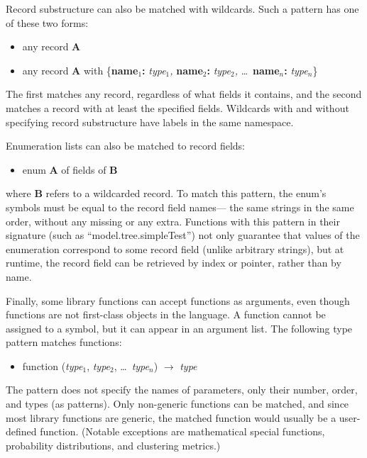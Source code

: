\documentclass{article}
\newcommand{\PFAp}{\ttfamily\bfseries}
\newcommand{\PFApf}{\ttfamily\bfseries}
\theoremstyle{definition}
\begin{document}
Record substructure can also be matched with wildcards.  Such a pattern has one of these two forms:
\begin{itemize}
\item any record {\PFAp A}
\item any record {\PFAp A} with \{{\PFApf name$_1$:} {\it type$_1$,} {\PFApf name$_2$:} {\it type$_2$,} \ldots\ {\PFApf name$_n$:} {\it type$_n$}\}
\end{itemize}
The first matches any record, regardless of what fields it contains, and the second matches a record with at least the specified fields.  Wildcards with and without specifying record substructure have labels in the same namespace.

Enumeration lists can also be matched to record fields:
\begin{itemize}
\item enum {\PFAp A} of fields of {\PFAp B}
\end{itemize}
where {\PFAp B} refers to a wildcarded record.  To match this pattern, the enum's symbols must be equal to the record field names--- the same strings in the same order, without any missing or any extra.  Functions with this pattern in their signature (such as ``model.tree.simpleTest'') not only guarantee that values of the enumeration correspond to some record field (unlike arbitrary strings), but at runtime, the record field can be retrieved by index or pointer, rather than by name.

Finally, some library functions can accept functions as arguments, even though functions are not first-class objects in the language.  A function cannot be assigned to a symbol, but it can appear in an argument list.  The following type pattern matches functions:
\begin{itemize}
\item function ({\it type$_1$}, {\it type$_2$}, \ldots\ {\it type$_n$}) $\to$ {\it type}
\end{itemize}
The pattern does not specify the names of parameters, only their number, order, and types (as patterns).  Only non-generic functions can be matched, and since most library functions are generic, the matched function would usually be a user-defined function.  (Notable exceptions are mathematical special functions, probability distributions, and clustering metrics.)
\end{document}
